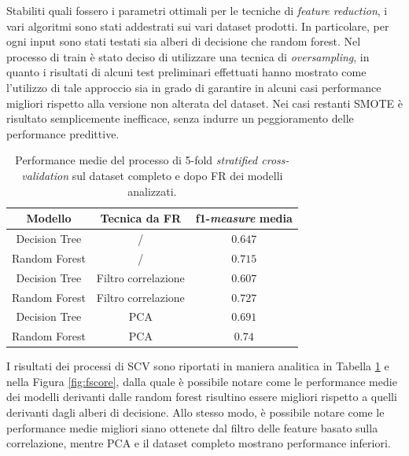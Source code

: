 Stabiliti quali fossero i parametri ottimali per le tecniche di \textit{feature reduction}, i vari algoritmi sono stati addestrati sui vari dataset prodotti.
In particolare, per ogni input sono stati testati sia alberi di decisione che random forest.
Nel processo di train è stato deciso di utilizzare una tecnica di \textit{oversampling}, in quanto i risultati di alcuni test preliminari effettuati hanno mostrato come l'utilizzo di tale approccio sia in grado di garantire in alcuni casi performance migliori rispetto alla versione non alterata del dataset. 
Nei casi restanti SMOTE è risultato semplicemente inefficace, senza indurre un peggioramento delle performance predittive.
\begin{table}
	\centering
	\caption{Performance medie del processo di 5-fold \textit{stratified cross-validation} sul dataset completo e dopo FR dei modelli analizzati.}
	\label{tab:f1score}
	\begin{tabular}{|c|c|c|}
		\toprule
		Modello & Tecnica da FR & f1-\textit{measure} media \\ 
		\midrule 
		Decision Tree & / & $0.647$ \\
		Random Forest & / & $0.715$ \\ 
		Decision Tree & Filtro correlazione & $0.607$ \\ 
		Random Forest & Filtro correlazione & $0.727$ \\ 
		Decision Tree & PCA & $0.691$ \\ 
		Random Forest & PCA & $0.74$ \\ 
		\bottomrule
	\end{tabular}
\end{table}
I risultati dei processi di SCV sono riportati in maniera analitica in Tabella \ref{tab:f1score} e nella Figura \ref{fig:fscore}, dalla quale è possibile notare come le performance medie dei modelli derivanti dalle random forest risultino essere migliori rispetto a quelli derivanti dagli alberi di decisione.
Allo stesso modo, è possibile notare come le performance medie migliori siano ottenete dal filtro delle feature basato sulla correlazione, mentre PCA e il dataset completo mostrano performance inferiori. 
